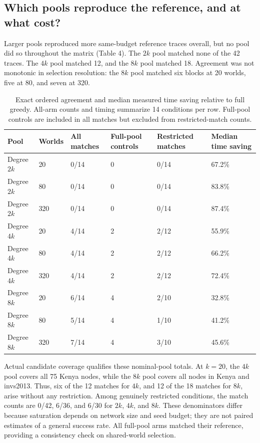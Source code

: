 \documentclass[smallextended]{svjour3}
\begin{document}
\subsection{Which pools reproduce the reference, and at what cost?}

Larger pools reproduced more same-budget reference traces overall, but no pool did so throughout the matrix (Table 4). The \(2k\) pool matched none of the 42 traces. The \(4k\) pool matched 12, and the \(8k\) pool matched 18. Agreement was not monotonic in selection resolution: the \(8k\) pool matched six blocks at 20 worlds, five at 80, and seven at 320.

\begin{table}[tbp]
\caption{Exact ordered agreement and median measured time saving relative to full greedy. All-arm counts and timing summarize 14 conditions per row. Full-pool controls are included in all matches but excluded from restricted-match counts.}
\label{tab:4}
\begin{tabularx}{\linewidth}{@{}lYYYYY@{}}
\toprule
\textbf{Pool} & \textbf{Worlds} & \textbf{All matches} & \textbf{Full-pool controls} & \textbf{Restricted matches} & \textbf{Median time saving} \\
\midrule
Degree \(2k\) & 20 & 0/14 & 0 & 0/14 & 67.2\% \\
Degree \(2k\) & 80 & 0/14 & 0 & 0/14 & 83.8\% \\
Degree \(2k\) & 320 & 0/14 & 0 & 0/14 & 87.4\% \\
Degree \(4k\) & 20 & 4/14 & 2 & 2/12 & 55.9\% \\
Degree \(4k\) & 80 & 4/14 & 2 & 2/12 & 66.2\% \\
Degree \(4k\) & 320 & 4/14 & 2 & 2/12 & 72.4\% \\
Degree \(8k\) & 20 & 6/14 & 4 & 2/10 & 32.8\% \\
Degree \(8k\) & 80 & 5/14 & 4 & 1/10 & 41.2\% \\
Degree \(8k\) & 320 & 7/14 & 4 & 3/10 & 45.6\% \\
\bottomrule
\end{tabularx}
\end{table}

Actual candidate coverage qualifies these nominal-pool totals. At \(k=20\), the \(4k\) pool covers all 75 Kenya nodes, while the \(8k\) pool covers all nodes in Kenya and invs2013. Thus, six of the 12 matches for \(4k\), and 12 of the 18 matches for \(8k\), arise without any restriction. Among genuinely restricted conditions, the match counts are 0/42, 6/36, and 6/30 for \(2k\), \(4k\), and \(8k\). These denominators differ because saturation depends on network size and seed budget; they are not paired estimates of a general success rate. All full-pool arms matched their reference, providing a consistency check on shared-world selection.
\end{document}
